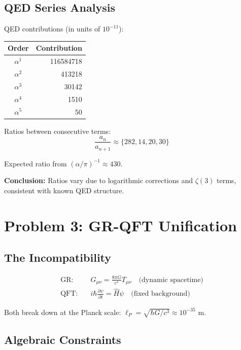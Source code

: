 \documentclass[twocolumn,prl,aps,superscriptaddress]{revtex4-2}
\begin{document}
\subsection{QED Series Analysis}

QED contributions (in units of $10^{-11}$):
\begin{center}
\begin{tabular}{cr}
Order & Contribution \\
\hline
$\alpha^1$ & 116584718 \\
$\alpha^2$ & 413218 \\
$\alpha^3$ & 30142 \\
$\alpha^4$ & 1510 \\
$\alpha^5$ & 50
\end{tabular}
\end{center}

Ratios between consecutive terms:
\begin{equation}
\frac{a_n}{a_{n+1}} \approx \{282, 14, 20, 30\}
\end{equation}

Expected ratio from $(\alpha/\pi)^{-1} \approx 430$.

\textbf{Conclusion:} Ratios vary due to logarithmic corrections and $\zeta(3)$ terms, 
consistent with known QED structure.

\section{Problem 3: GR-QFT Unification}

\subsection{The Incompatibility}

\begin{align}
\text{GR:} &\quad G_{\mu\nu} = \frac{8\pi G}{c^4} T_{\mu\nu} \quad \text{(dynamic spacetime)} \\
\text{QFT:} &\quad i\hbar \frac{\partial \psi}{\partial t} = \hat{H}\psi \quad \text{(fixed background)}
\end{align}

Both break down at the Planck scale: $\ell_P = \sqrt{\hbar G/c^3} \approx 10^{-35}$ m.

\subsection{Algebraic Constraints}
\end{document}
